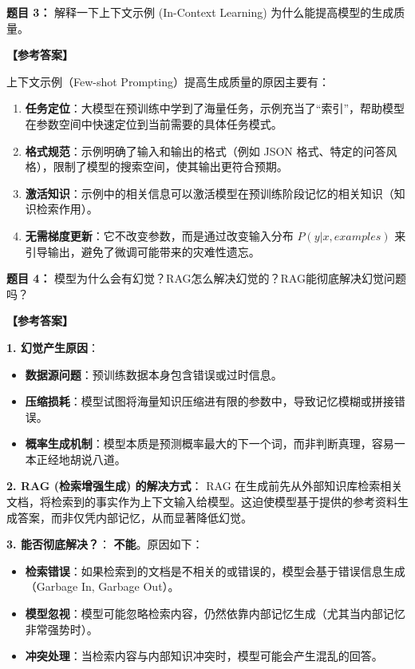 \documentclass[a4paper,11pt]{article}
\newenvironment{question}[1]
    {\vspace{0.5cm}\noindent\textbf{题目 #1：}}
    {\vspace{0.2cm}}
\newenvironment{answer}
    {\noindent\textbf{【参考答案】}\par\small\color{blue}}
    {\par\vspace{0.5cm}\normalcolor}
\begin{document}
\begin{question}{3}
解释一下上下文示例 (In-Context Learning) 为什么能提高模型的生成质量。
\end{question}

\begin{answer}
上下文示例（Few-shot Prompting）提高生成质量的原因主要有：
\begin{enumerate}
    \item \textbf{任务定位}：大模型在预训练中学到了海量任务，示例充当了“索引”，帮助模型在参数空间中快速定位到当前需要的具体任务模式。
    \item \textbf{格式规范}：示例明确了输入和输出的格式（例如 JSON 格式、特定的问答风格），限制了模型的搜索空间，使其输出更符合预期。
    \item \textbf{激活知识}：示例中的相关信息可以激活模型在预训练阶段记忆的相关知识（知识检索作用）。
    \item \textbf{无需梯度更新}：它不改变参数，而是通过改变输入分布 $P(y|x, examples)$ 来引导输出，避免了微调可能带来的灾难性遗忘。
\end{enumerate}
\end{answer}

\begin{question}{4}
模型为什么会有幻觉？RAG怎么解决幻觉的？RAG能彻底解决幻觉问题吗？
\end{question}

\begin{answer}
\textbf{1. 幻觉产生原因}：
\begin{itemize}
    \item \textbf{数据源问题}：预训练数据本身包含错误或过时信息。
    \item \textbf{压缩损耗}：模型试图将海量知识压缩进有限的参数中，导致记忆模糊或拼接错误。
    \item \textbf{概率生成机制}：模型本质是预测概率最大的下一个词，而非判断真理，容易一本正经地胡说八道。
\end{itemize}

\textbf{2. RAG (检索增强生成) 的解决方式}：
RAG 在生成前先从外部知识库检索相关文档，将检索到的事实作为上下文输入给模型。这迫使模型基于提供的参考资料生成答案，而非仅凭内部记忆，从而显著降低幻觉。

\textbf{3. 能否彻底解决？}：
\textbf{不能}。原因如下：
\begin{itemize}
    \item \textbf{检索错误}：如果检索到的文档是不相关的或错误的，模型会基于错误信息生成（Garbage In, Garbage Out）。
    \item \textbf{模型忽视}：模型可能忽略检索内容，仍然依靠内部记忆生成（尤其当内部记忆非常强势时）。
    \item \textbf{冲突处理}：当检索内容与内部知识冲突时，模型可能会产生混乱的回答。
\end{itemize}
\end{answer}
\end{document}
